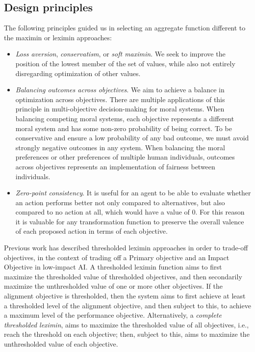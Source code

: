 
\subsection{Design principles}
The following principles guided us in selecting an aggregate function different to the maximin or leximin approaches:
\begin{itemize}
    \item \textit{Loss aversion}, \textit{conservatism}, or \textit{soft maximin}. We seek to improve the position of the lowest member of the set of values, while also not entirely disregarding optimization of other values.
    \item \textit{Balancing outcomes across objectives}. We aim to achieve a balance in optimization across objectives. There are multiple applications of this principle in multi-objective decision-making for moral systems. When balancing competing moral systems, each objective represents a different moral system and has some non-zero probability of being correct. To be conservative and ensure a low probability of any bad outcome, we must avoid strongly negative outcomes in any system. When balancing the moral preferences or other preferences of multiple human individuals, outcomes across objectives represents an implementation of fairness between individuals.
    \item \textit{Zero-point consistency}. It is useful for an agent to be able to evaluate whether an action performs better not only compared to alternatives, but also compared to no action at all, which would have a value of 0. For this reason it is valuable for any transformation function to preserve the overall valence of each proposed action in terms of each objective.
\end{itemize}

Previous work \cite{vamplew_potential-based_2021} has described thresholded leximin approaches in order to trade-off objectives, in the context of trading off a Primary objective and an Impact Objective in low-impact AI. A thresholded leximin function aims to first maximize the thresholded value of thresholded objectives, and then secondarily maximize the unthresholded value of one or more other objectives. If the alignment objective is thresholded, then the system aims to first achieve at least a thresholded level of the alignment objective, and then subject to this, to achieve a maximum level of the performance objective. Alternatively, a \textit{complete thresholded leximin}, aims to maximize the thresholded value of all objectives, i.e., reach the threshold on each objective; then, subject to this, aims to maximize the unthresholded value of each objective.

